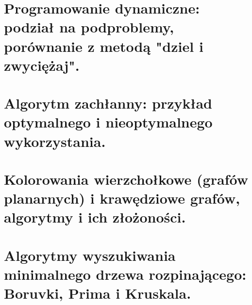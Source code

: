 \documentclass[12pt]{article}
\begin{document}
    \section{Programowanie dynamiczne: podział na podproblemy, porównanie z metodą "dziel i zwyciężaj".}
    \section{Algorytm zachłanny: przykład optymalnego i nieoptymalnego wykorzystania.}
    
    \newpage
    
    \section{Kolorowania wierzchołkowe (grafów planarnych) i krawędziowe grafów, algorytmy i ich złożoności.}
    
    \newpage
    
    \section{Algorytmy wyszukiwania minimalnego drzewa rozpinającego: Boruvki, Prima i Kruskala.}
    
\end{document}
